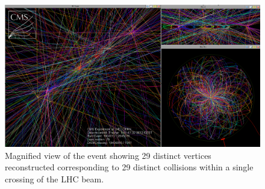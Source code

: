 \begin{figure}[t]
  \centering
  \includegraphics[width=1.0\textwidth]{04_event_reconstruction/plots/url.png}
  \caption{Magnified view of the event showing 29 distinct vertices reconstructed corresponding to 29 distinct collisions within a single crossing of the LHC beam.}
  \label{fig:HugePU}
\end{figure}
